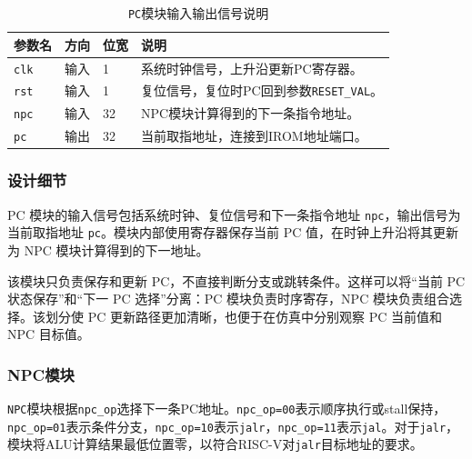 \documentclass[12pt,a4paper]{ctexart}
\newcommand{\code}[1]{\texttt{#1}}
\begin{document}
\begin{table}[H]
\centering
\caption{\code{PC}模块输入输出信号说明}
\footnotesize
\renewcommand{\arraystretch}{1.15}
\begin{tabularx}{\textwidth}{p{3.2cm}p{1.5cm}p{2.1cm}X}
\toprule
参数名 & 方向 & 位宽 & 说明 \\
\midrule
\code{clk} & 输入 & 1 & 系统时钟信号，上升沿更新PC寄存器。 \\
\code{rst} & 输入 & 1 & 复位信号，复位时PC回到参数\code{RESET\_VAL}。 \\
\code{npc} & 输入 & 32 & NPC模块计算得到的下一条指令地址。 \\
\code{pc} & 输出 & 32 & 当前取指地址，连接到IROM地址端口。 \\
\bottomrule
\end{tabularx}
\end{table}

\subsubsection*{设计细节}

PC 模块的输入信号包括系统时钟、复位信号和下一条指令地址 \code{npc}，输出信号为当前取指地址 \code{pc}。模块内部使用寄存器保存当前 PC 值，在时钟上升沿将其更新为 NPC 模块计算得到的下一地址。

该模块只负责保存和更新 PC，不直接判断分支或跳转条件。这样可以将“当前 PC 状态保存”和“下一 PC 选择”分离：PC 模块负责时序寄存，NPC 模块负责组合选择。该划分使 PC 更新路径更加清晰，也便于在仿真中分别观察 PC 当前值和 NPC 目标值。

\subsubsection{NPC模块}

\code{NPC}模块根据\code{npc\_op}选择下一条PC地址。\code{npc\_op=00}表示顺序执行或stall保持，\code{npc\_op=01}表示条件分支，\code{npc\_op=10}表示\code{jalr}，\code{npc\_op=11}表示\code{jal}。对于\code{jalr}，模块将ALU计算结果最低位置零，以符合RISC-V对\code{jalr}目标地址的要求。
\end{document}
